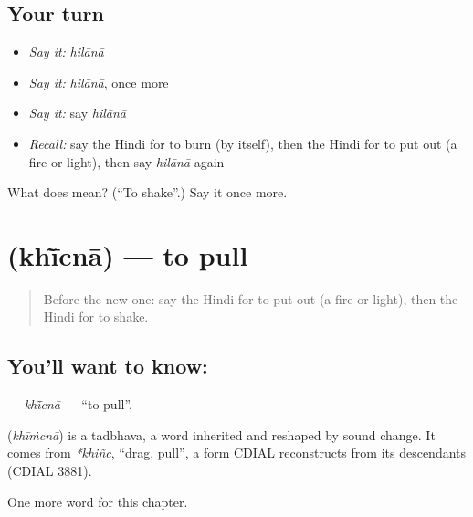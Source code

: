 \subsection*{Your turn}
\begin{itemize}
\raggedright
  \item \emph{Say it:} \emph{hilānā}
  \item \emph{Say it:} \emph{hilānā}, once more
  \item \emph{Say it:} say \emph{hilānā}
  \item \emph{Recall:} say the Hindi for to burn (by itself), then the Hindi for to put out (a fire or light), then say \emph{hilānā} again
\end{itemize}

\begin{tcolorbox}[breakable,colback=teal!4,colframe=teal!35!black,title={Before you move on}]
What does  mean? (\textquotedblleft{}To shake\textquotedblright{}.) Say it once more.
\end{tcolorbox}
\section[\texorpdfstring{\hi{खींचना} (khī̃cnā)}{खींचना (khī̃cnā)}]{ (khī̃cnā) — to pull}

\label{lesson:HI-C176-khicna}



\begin{quote}
Before the new one: say the Hindi for to put out (a fire or light), then the Hindi for to shake.
\end{quote}

\subsection*{You'll want to know: }
\textbf{} — \emph{khī̃cnā} — \textquotedblleft{}to pull\textquotedblright{}.

\begin{cousinweb}
\textbf{} (\emph{khīṁcnā}) is a tadbhava, a word inherited and reshaped by sound change. It comes from \emph{*khiñc}, \textquotedblleft{}drag, pull\textquotedblright{}, a form CDIAL reconstructs from its descendants (CDIAL 3881).
\end{cousinweb}

\begin{grammarlens}[title={What you've built}]
One more word for this chapter.
\end{grammarlens}

